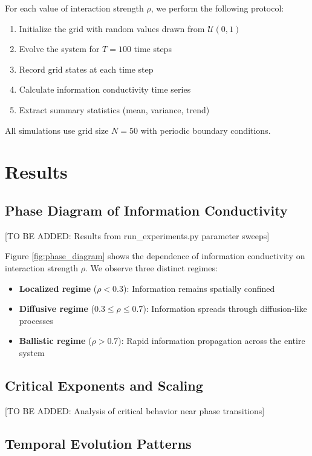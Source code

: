 \documentclass[twocolumn,showpacs,preprintnumbers,amsmath,amssymb,prb]{revtex4-2}
\begin{document}
For each value of interaction strength $\rho$, we perform the following protocol:
\begin{enumerate}
\item Initialize the grid with random values drawn from $\mathcal{U}(0,1)$
\item Evolve the system for $T = 100$ time steps
\item Record grid states at each time step
\item Calculate information conductivity time series
\item Extract summary statistics (mean, variance, trend)
\end{enumerate}

All simulations use grid size $N = 50$ with periodic boundary conditions.

\section{Results}

\subsection{Phase Diagram of Information Conductivity}

[TO BE ADDED: Results from run_experiments.py parameter sweeps]

Figure \ref{fig:phase_diagram} shows the dependence of information conductivity on interaction strength $\rho$. We observe three distinct regimes:

\begin{itemize}
\item \textbf{Localized regime} ($\rho < 0.3$): Information remains spatially confined
\item \textbf{Diffusive regime} ($0.3 \leq \rho \leq 0.7$): Information spreads through diffusion-like processes  
\item \textbf{Ballistic regime} ($\rho > 0.7$): Rapid information propagation across the entire system
\end{itemize}

\subsection{Critical Exponents and Scaling}

[TO BE ADDED: Analysis of critical behavior near phase transitions]

\subsection{Temporal Evolution Patterns}
\end{document}
